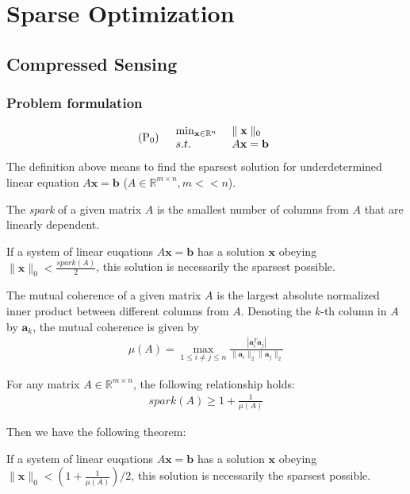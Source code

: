 \chapter{Sparse Optimization}
\vspace{1em}
\section{Compressed Sensing}
\subsection{Problem formulation}
\begin{align}
    (\textnormal{P}_0) \quad
    \begin{array}{ll}
        \min_{\mathbf{x} \in \mathbb{R}^n}
        \ &\parallel \mathbf{x} \parallel_0 \\
        s.t. \ &A\mathbf{x} = \mathbf{b}
    \end{array}
\end{align}
The definition above means to find
the sparsest solution for underdetermined
linear equation
$A\mathbf{x} = \mathbf{b}$
($A\in \mathbb{R}^{m\times n}, m << n$).
\begin{definition}[spark]
    The \emph{spark} of a given matrix $A$
    is the smallest number of columns
    from $A$ that are linearly
    dependent.
\end{definition}
\begin{theorem}
    If a system of linear euqations
    $A\mathbf{x} = \mathbf{b}$ has
    a solution $\mathbf{x}$ obeying
    $\parallel \mathbf{x} \parallel_0
    < \frac{spark(A)}{2}$,
    this solution is necessarily
    the sparsest possible.
\end{theorem}
\begin{definition}
    The mutual coherence of a given matrix $A$
    is the largest absolute normalized inner
    product between different columns from $A$.
    Denoting the $k$-th column in $A$ by $\mathbf{a}_k$,
    the mutual coherence is given by
    \begin{align}
        \mu(A) = \max_{1\leq i \neq j \leq n}
        \frac{|\mathbf{a}_i^T\mathbf{a}_j|}
        {\parallel\mathbf{a}_i\parallel_2
        \parallel\mathbf{a}_j\parallel_2}
    \end{align}
\end{definition}
\begin{lemma}
    For any matrix $A \in \mathbb{R}^{m\times n}$,
    the following relationship holds:
    \begin{align}
        spark(A) \geq 1 + \frac{1}{\mu(A)}
    \end{align}
\end{lemma}
Then we have the following theorem:
\begin{theorem}
    If a system of linear euqations
    $A\mathbf{x} = \mathbf{b}$ has
    a solution $\mathbf{x}$ obeying
    $\parallel \mathbf{x} \parallel_0
    < (1 + \frac{1}{\mu(A)})/2$,
    this solution is necessarily
    the sparsest possible.
\end{theorem}
